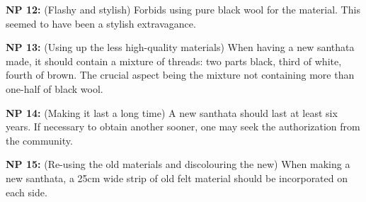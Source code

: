 \textbf{NP 12:} (Flashy and stylish) Forbids using pure black wool for
the material. This seemed to have been a stylish extravagance.

\textbf{NP 13:} (Using up the less high-quality materials) When having a
new santhata made, it should contain a mixture of threads: two parts
black, third of white, fourth of brown. The crucial aspect being the
mixture not containing more than one-half of black wool.

\textbf{NP 14:} (Making it last a long time) A new santhata should last
at least six years. If necessary to obtain another sooner, one may seek
the authorization from the community.

\textbf{NP 15:} (Re-using the old materials and discolouring the new)
When making a new santhata, a 25cm wide strip of old felt material
should be incorporated on each side.

